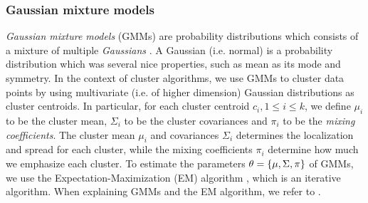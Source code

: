 \subsubsection{Gaussian mixture models}
\label{sec:gmm-clustering}
\textit{Gaussian mixture models} (GMMs) are probability distributions which consists of a mixture of multiple \textit{Gaussians} \cite[Section 9.2]{bishop2006}. A Gaussian (i.e. normal) is a probability distribution which was several nice properties, such as mean as its mode and symmetry. In the context of cluster algorithms, we use GMMs to cluster data points by using multivariate (i.e. of higher dimension) Gaussian distributions as cluster centroids. In particular, for each cluster centroid $c_i, 1 \leq i \leq k$, we define $\mu_i$ to be the cluster mean, $\Sigma_i$ to be the cluster covariances and $\pi_i$ to be the \textit{mixing coefficients}. The cluster mean $\mu_i$ and covariances $\Sigma_i$ determines the localization and spread for each cluster, while the mixing coefficients $\pi_i$ determine how much we emphasize each cluster. To estimate the parameters $\theta = \left\{\mu, \Sigma, \pi\right\}$ of GMMs, we use the Expectation-Maximization (EM) algorithm , which is an iterative algorithm. When explaining GMMs and the EM algorithm, we refer to \cite[Section 9.2]{bishop2006}.

